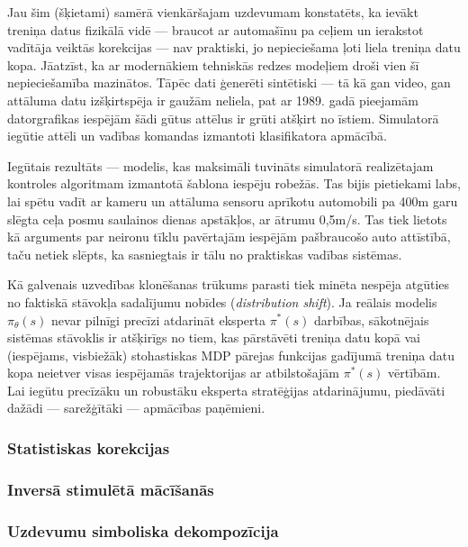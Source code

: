\documentclass[12pt, a4paper]{article}
\numberwithin{equation}{section} %
\begin{document}
Jau šim (šķietami) samērā vienkāršajam uzdevumam konstatēts, ka ievākt treniņa datus fizikālā vidē --- braucot ar automašīnu pa ceļiem un ierakstot vadītāja veiktās korekcijas --- nav praktiski, jo nepieciešama ļoti liela treniņa datu kopa. Jāatzīst, ka ar modernākiem tehniskās redzes modeļiem droši vien šī nepieciešamība mazinātos. Tāpēc dati ģenerēti sintētiski --- tā kā gan video, gan attāluma datu izšķirtspēja ir gaužām neliela, pat ar 1989. gadā pieejamām datorgrafikas iespējām šādi gūtus attēlus ir grūti atšķirt no īstiem. Simulatorā iegūtie attēli un vadības komandas izmantoti klasifikatora apmācībā.

Iegūtais rezultāts --- modelis, kas maksimāli tuvināts simulatorā realizētajam kontroles algoritmam izmantotā šablona iespēju robežās. Tas bijis pietiekami labs, lai spētu vadīt ar kameru un attāluma sensoru aprīkotu automobili pa 400m garu slēgta ceļa posmu saulainos dienas apstākļos, ar ātrumu 0,5m/s. Tas tiek lietots kā arguments par neironu tīklu pavērtajām iespējām pašbraucošo auto attīstībā, taču netiek slēpts, ka sasniegtais ir tālu no praktiskas vadības sistēmas.

Kā galvenais uzvedības klonēšanas trūkums parasti tiek minēta nespēja atgūties no faktiskā stāvokļa sadalījumu nobīdes\cite{attia2018global} (\textit{distribution shift}). Ja reālais modelis $\pi_{\theta}(s)$ nevar pilnīgi precīzi atdarināt eksperta $\pi^*(s)$ darbības, sākotnējais sistēmas stāvoklis ir atšķirīgs no tiem, kas pārstāvēti treniņa datu kopā vai (iespējams, visbiežāk) stohastiskas MDP pārejas funkcijas gadījumā treniņa datu kopa neietver visas iespējamās trajektorijas ar atbilstošajām $\pi^*(s)$ vērtībām. Lai iegūtu precīzāku un robustāku eksperta stratēģijas atdarinājumu, piedāvāti dažādi --- sarežģītāki --- apmācības paņēmieni.


\subsubsection{Statistiskas korekcijas}

\subsubsection{Inversā stimulētā mācīšanās}

\subsubsection{Uzdevumu simboliska dekompozīcija}
\end{document}
